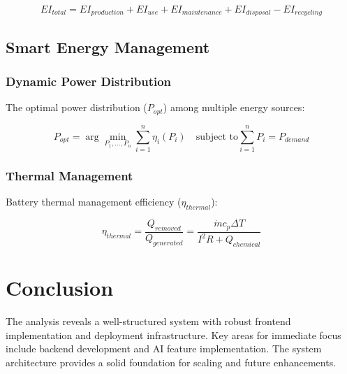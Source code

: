 \documentclass[12pt,a4paper]{article}
\begin{document}
\begin{equation}
EI_{total} = EI_{production} + EI_{use} + EI_{maintenance} + EI_{disposal} - EI_{recycling}
\end{equation}

\subsection{Smart Energy Management}
\subsubsection{Dynamic Power Distribution}
The optimal power distribution (\(P_{opt}\)) among multiple energy sources:

\begin{equation}
P_{opt} = \arg\min_{P_1,\ldots,P_n} \sum_{i=1}^{n} \eta_i(P_i) \quad \text{subject to} \sum_{i=1}^{n} P_i = P_{demand}
\end{equation}

\subsubsection{Thermal Management}
Battery thermal management efficiency (\(\eta_{thermal}\)):

\begin{equation}
\eta_{thermal} = \frac{Q_{removed}}{Q_{generated}} = \frac{\dot{m}c_p\Delta T}{I^2R + Q_{chemical}}
\end{equation}

\section{Conclusion}
The analysis reveals a well-structured system with robust frontend implementation and deployment infrastructure. Key areas for immediate focus include backend development and AI feature implementation. The system architecture provides a solid foundation for scaling and future enhancements.
\end{document}
